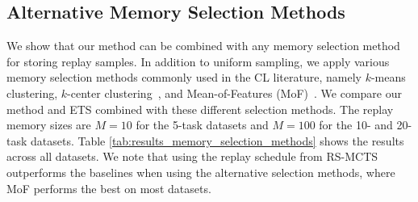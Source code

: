 
\subsection{Alternative Memory Selection Methods}
\label{paperC:sec:alternative_memory_selection_methods}

We show that our method can be combined with any memory selection method for storing replay samples. In addition to uniform sampling, we apply various memory selection methods commonly used in the CL literature, namely $k$-means clustering, $k$-center clustering~, and Mean-of-Features (MoF)~. We compare our method and ETS combined with these different selection methods. 
The replay memory sizes are $M=10$ for the 5-task datasets and $M=100$ for the 10- and 20-task datasets. 
Table \ref{tab:results_memory_selection_methods} shows the results across all datasets. 
We note that using the replay schedule from RS-MCTS outperforms the baselines when using the alternative selection methods, where MoF performs the best on most datasets. 



